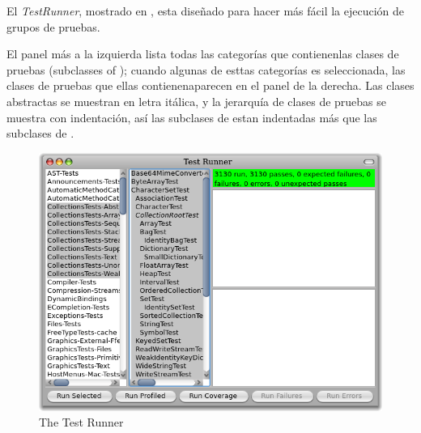 \documentclass[a4paper,10pt,twoside]{book}
\begin{document}
El \emph{TestRunner}, mostrado en , esta dise\~nado para hacer más
fácil la ejecución de grupos de pruebas.

El panel más a la izquierda lista todas las categorías que contienenlas clases de pruebas
(\ie  subclasses of ); cuando algunas de esttas categorías es seleccionada, las clases de pruebas
que ellas contienenaparecen en el panel de la derecha.
Las clases abstractas se muestran en letra itálica, y la jerarquía de clases de pruebas se muestra con indentación,
así las subclases de  estan indentadas más que las subclases de .


\begin{figure}[tbh]
  \begin{center}
	\includegraphics[width=\linewidth]{test-runner}
	\caption{The \pharo \sunit Test Runner}
  \end{center}
\end{figure}



\end{document}
